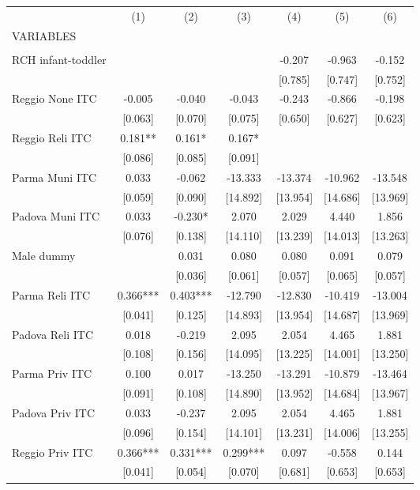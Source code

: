 \begin{tabular}{lcccccc} \hline
 & (1) & (2) & (3) & (4) & (5) & (6) \\
VARIABLES &  &  &  &  &  &  \\ \hline
 &  &  &  &  &  &  \\
RCH infant-toddler &  &  &  & -0.207 & -0.963 & -0.152 \\
 &  &  &  & [0.785] & [0.747] & [0.752] \\
Reggio None ITC & -0.005 & -0.040 & -0.043 & -0.243 & -0.866 & -0.198 \\
 & [0.063] & [0.070] & [0.075] & [0.650] & [0.627] & [0.623] \\
Reggio Reli ITC & 0.181** & 0.161* & 0.167* &  &  &  \\
 & [0.086] & [0.085] & [0.091] &  &  &  \\
Parma Muni ITC & 0.033 & -0.062 & -13.333 & -13.374 & -10.962 & -13.548 \\
 & [0.059] & [0.090] & [14.892] & [13.954] & [14.686] & [13.969] \\
Padova Muni ITC & 0.033 & -0.230* & 2.070 & 2.029 & 4.440 & 1.856 \\
 & [0.076] & [0.138] & [14.110] & [13.239] & [14.013] & [13.263] \\
Male dummy &  & 0.031 & 0.080 & 0.080 & 0.091 & 0.079 \\
 &  & [0.036] & [0.061] & [0.057] & [0.065] & [0.057] \\
Parma Reli ITC & 0.366*** & 0.403*** & -12.790 & -12.830 & -10.419 & -13.004 \\
 & [0.041] & [0.125] & [14.893] & [13.954] & [14.687] & [13.969] \\
Padova Reli ITC & 0.018 & -0.219 & 2.095 & 2.054 & 4.465 & 1.881 \\
 & [0.108] & [0.156] & [14.095] & [13.225] & [14.001] & [13.250] \\
Parma Priv ITC & 0.100 & 0.017 & -13.250 & -13.291 & -10.879 & -13.464 \\
 & [0.091] & [0.108] & [14.890] & [13.952] & [14.684] & [13.967] \\
Padova Priv ITC & 0.033 & -0.237 & 2.095 & 2.054 & 4.465 & 1.881 \\
 & [0.096] & [0.154] & [14.101] & [13.231] & [14.006] & [13.255] \\
Reggio Priv ITC & 0.366*** & 0.331*** & 0.299*** & 0.097 & -0.558 & 0.144 \\
 & [0.041] & [0.054] & [0.070] & [0.681] & [0.653] & [0.653] \\

\end{tabular}
